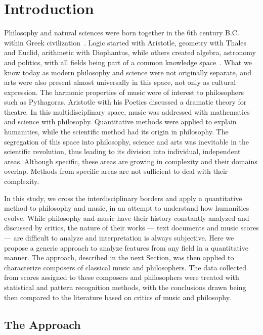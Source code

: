 \documentclass[
 aip,
 jmp,
 amsmath,amssymb,
 reprint,
]{revtex4-1}
\begin{document}
\section{\label{sec:level1}Introduction}

Philosophy and natural sciences were born together in the 6th century
B.C. within Greek civilization~\cite{Russel}. Logic started with
Aristotle, geometry with Thales and Euclid, arithmetic with
Diophantus, while others created algebra, astronomy and politics, with
all fields being part of a common knowledge
space~\cite{Papineau}. What we know today as modern philosophy and
science were not originally separate, and arts were also present
almost universally in this space, not only as cultural expression. The
harmonic properties of music were of interest to philosophers such as
Pythagoras. Aristotle with his Poetics discussed a dramatic theory for
theatre. In this multidisciplinary space, music was addressed with
mathematics and science with philosophy. Quantitative methods were
applied to explain humanities, while the scientific method had its
origin in philosophy. The segregation of this space into philosophy,
science and arts was inevitable in the scientific revolution, thus
leading to its division into individual, independent areas. Although
specific, these areas are growing in complexity and their domains
overlap. Methods from specific areas are not sufficient to deal with
their complexity.

In this study, we cross the interdisciplinary borders and apply a
quantitative method to philosophy and music, in an attempt to
understand how humanities evolve. While philosophy and music have
their history constantly analyzed and discussed by critics, the nature
of their works --- text documents and music scores --- are difficult
to analyze and interpretation is always subjective. Here we propose a
generic approach to analyze features from any field in a quantitative
manner. The approach, described in the next Section, was then applied
to characterize composers of classical music and philosophers. The
data collected from scores assigned to these composers and
philosophers were treated with statistical and pattern recognition
methods, with the conclusions drawn being then compared to the
literature based on critics of music and philosophy.

\subsection{The Approach}
\end{document}
